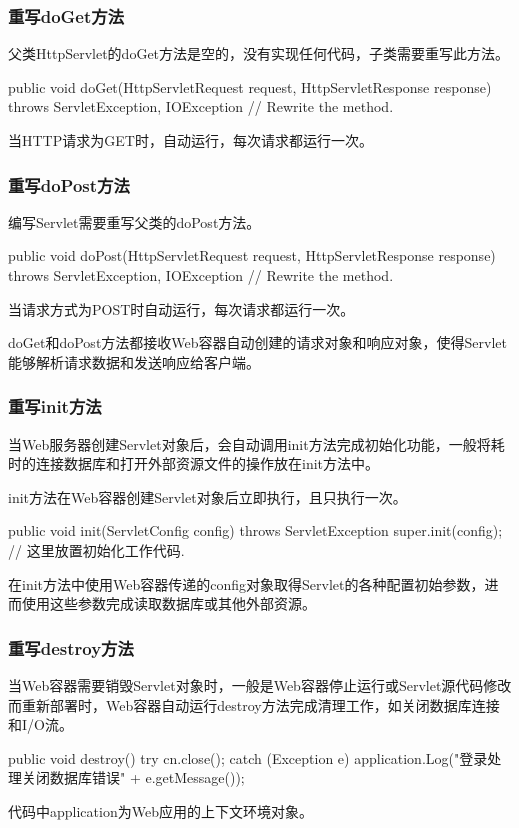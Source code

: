\begin{frame}[fragile] %
\frametitle{重写doGet方法} 

父类HttpServlet的doGet方法是空的，没有实现任何代码，子类需要重写此方法。

\begin{javaCode}

public void doGet(HttpServletRequest request, HttpServletResponse response) 
throws ServletException, IOException {
  // Rewrite the method.
}
\end{javaCode}

当HTTP请求为GET时，自动运行，每次请求都运行一次。
\end{frame}

\begin{frame}[fragile] %
\frametitle{重写doPost方法} 

编写Servlet需要重写父类的doPost方法。

\begin{javaCode}
public void doPost(HttpServletRequest request, HttpServletResponse response)  
throws ServletException, IOException {
  // Rewrite the method.
}
\end{javaCode}
当请求方式为POST时自动运行，每次请求都运行一次。

{\hei\Red doGet和doPost方法都接收Web容器自动创建的请求对象和响应对象，使得Servlet能够解析请求数据和发送响应给客户端。}
\end{frame}

\begin{frame}[fragile] %
\frametitle{重写init方法} 

当Web服务器创建Servlet对象后，会自动调用init方法完成初始化功能，一般将耗时的连接数据库和打开外部资源文件的操作放在init方法中。

init方法在Web容器创建Servlet对象后立即执行，且只执行一次。

\begin{javaCode}
public void init(ServletConfig config) throws ServletException {
  super.init(config);
  // 这里放置初始化工作代码.
}
\end{javaCode}

\kai 在init方法中使用Web容器传递的config对象取得Servlet的各种配置初始参数，进而使用这些参数完成读取数据库或其他外部资源。
\end{frame}

\begin{frame}[fragile] %
\frametitle{重写destroy方法} 

当Web容器需要销毁Servlet对象时，一般是Web容器停止运行或Servlet源代码修改而重新部署时，Web容器自动运行destroy方法完成清理工作，如关闭数据库连接和I/O流。

\begin{javaCode}
public  void destroy() {
  try {
    cn.close();
  } catch (Exception e) {
    application.Log("登录处理关闭数据库错误" + e.getMessage());
  }
}
\end{javaCode}

\kai 代码中application为Web应用的上下文环境对象。
\end{frame}

